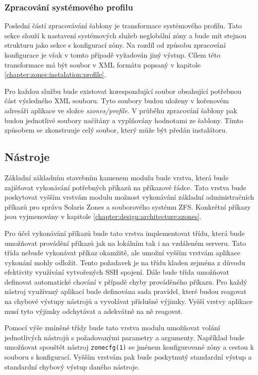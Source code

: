\subsubsection{Zpracování systémového profilu}
\label{chapter:implementation:szones:template:profile}
Poslední částí zpracovávání šablony je transformace systémového profilu. Tato sekce slouží k nastavení systémových služeb
neglobální zóny a bude mít stejnou strukturu jako sekce s konfigurací zóny. Na rozdíl od způsobu zpracování konfigurace je
však v tomto případě vyžadován jiný výstup. Cílem této transformace má být soubor v XML formátu popsaný v kapitole \ref{chapter:zones:instalation:profile}.

Pro každou službu bude existovat korespondující soubor obsahující potřebnou část výsledného XML souboru. Tyto soubory budou
uloženy v kořenovém adresáři aplikace ve složce \textit{szones/profile}. V průběhu zpracování šablony pak budou jednotlivé soubory
načítány a vyplňovány hodnotami ze šablony. Tímto způsobem se zkonstruuje celý soubor, který může být předán instalátoru.
\subsection{Nástroje}
\label{chapter:implementation:szones:commands}
Základní základním stavebním kamenem modulu bude vrstva, která bude zajišťovat vykonávání potřebných příkazů na příkazové řádce.
Tato vrstva bude poskytovat vyšším vrstvám modulu možnost vykonávání základní administračních příkazů pro správu Solaris Zones
a souborového systému ZFS. Konkrétní příkazy jsou vyjmenovány v kapitole \ref{chapter:design:architecture:szones}.

Pro účel vykonávání příkazů bude tato vrstva implementovat třídu, která bude umožňovat provádění příkazů jak na lokálním tak i
na vzdáleném serveru. Tato třída nebude vykonávat příkaz okamžitě, ale umožní vyšším vrstvám aplikace vykonání mohly odložit.
Tento požadavek je na třídu kladen zejména z důvodu efektivity využívání vytvořených SSH spojení. Dále bude třída umožňovat
definovat automatické chování v případě chyby prováděného příkazu. Pro každý nástroj využívaný aplikací bude definována sada
pravidel, které budou reagovat na chybové výstupy nástrojů a vyvolávat příslušné výjimky. Vyšší vrstvy aplikace musí tyto výjimky
odchytávat a adekvátně na ně reagovat.

Pomocí výše zmíněné třídy bude tato vrstva modulu umožňovat volání jednotlivých nástrojů s požadovanými parametry a argumenty.
Například bude umožňovat spouštět nástroj \verb|zonecfg(1)| se jménem konfigurované zóny a cestou k souboru s konfigurací. Vyšším
vrstvám pak bude poskytnutý standardní výstup a standardní chybový výstup daného nástroje.
